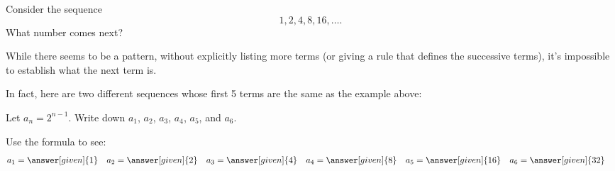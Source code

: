 \documentclass{ximera}
\begin{document}
\begin{question}
  Consider the sequence
  \[
  1, 2, 4, 8, 16, \dots.
  \]
  What number comes next?
  \begin{multipleChoice}
  \end{multipleChoice}

While there seems to be a pattern, without explicitly listing more terms (or giving a rule that defines the successive terms), it's impossible to establish what the next term is. 

\end{question}

In fact, here are two different sequences whose first 5 terms are the same as the example above:

\begin{example}
  Let $a_n = 2^{n-1}$.  Write down $a_1$, $a_2$, $a_3$, $a_4$, $a_5$, and
  $a_6$.
  \begin{explanation}
    Use the formula to see:
    \begin{align*}
      a_1 &= \answer[given]{1} & a_2 &= \answer[given]{2} & 
      a_3 &= \answer[given]{4} & 
      a_4 &= \answer[given]{8} & 
      a_5 &= \answer[given]{16} & 
      a_6 &= \answer[given]{32}
    \end{align*}
  \end{explanation}
\end{example}
\end{document}
